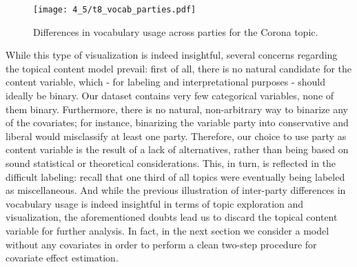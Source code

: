 \documentclass[12pt]{article}
\begin{document}
\begin{figure}[h!]
  \centering
  \captionsetup{justification=centering,margin=2cm}
  \texttt{[image: 4\_5/t8\_vocab\_parties.pdf]}
  \caption{Differences in vocabulary usage across parties for the Corona topic.}
  \label{fig:t8_vocab_parties}
\end{figure}

While this type of visualization is indeed insightful, several concerns regarding the topical content model prevail: first of all, there is no natural candidate for the content variable, which - for labeling and interpretational purposes - should ideally be binary. Our dataset contains very few categorical variables, none of them binary. Furthermore, there is no natural, non-arbitrary way to binarize any of the covariates; for instance, binarizing the variable party into conservative and liberal would misclassify at least one party. Therefore, our choice to use party as content variable is the result of a lack of alternatives, rather than being based on sound statistical or theoretical considerations. This, in turn, is reflected in the difficult labeling: recall that one third of all topics were eventually being labeled as miscellaneous. And while the previous illustration of inter-party differences in vocabulary usage is indeed insightful in terms of topic exploration and visualization, the aforementioned doubts lead us to discard the topical content variable for further analysis. In fact, in the next section we consider a model without any covariates in order to perform a clean two-step procedure for covariate effect estimation.




\end{document}

